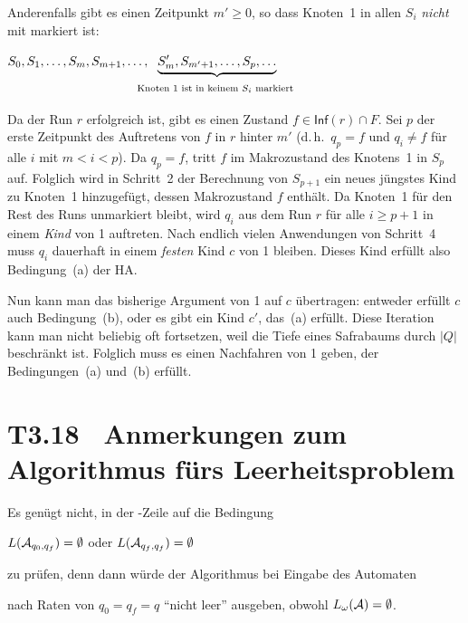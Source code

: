 \documentclass[fontsize=11pt, twoside=false, numbers=autoenddot]{scrbook}
\begin{document}
Anderenfalls gibt es einen Zeitpunkt $m' \geq 0$, %
so dass Knoten~1 in allen $S_i$ \emph{nicht} mit \circled{!} markiert ist:
%
\begin{center}
  $S_0,S_1,\dots,S_m,S_{m+1},\dots,\!\!\!\!\!\!\underbrace{S_m',S_{m'+1},\dots,S_p,\dots}_{%
    \text{%
      \begin{tabular}{@{}l@{}}
        Knoten 1 ist in keinem $S_i$ markiert %
      \end{tabular}
    }
  }$
\end{center}
%
Da der Run $r$ erfolgreich ist, gibt es einen Zustand $f \in \textsf{Inf}(r) \cap F$.
Sei $p$ der erste Zeitpunkt des Auftretens von $f$ in $r$ hinter $m'$
(d.\,h.\ $q_p = f$ und $q_i \neq f$ für alle $i$ mit $m < i < p$).
Da $q_p = f$, tritt $f$ im Makrozustand des Knotens~1 in $S_p$ auf.
Folglich wird in Schritt~2 der Berechnung von $S_{p+1}$ ein neues jüngstes Kind
zu Knoten~1 hinzugefügt, dessen Makrozustand $f$ enthält.
Da Knoten~1 für den Rest des Runs unmarkiert bleibt,
wird $q_i$ aus dem Run $r$ für alle $i \geq p+1$ in einem \emph{Kind} von 1 auftreten.
Nach endlich vielen Anwendungen von Schritt~4 muss $q_i$ dauerhaft
in einem \emph{festen} Kind $c$ von 1 bleiben.
Dieses Kind erfüllt also Bedingung~(a) der HA.

Nun kann man das bisherige Argument von 1 auf $c$ übertragen:
entweder erfüllt $c$ auch Bedingung~(b),
oder es gibt ein Kind $c'$, das~(a) erfüllt.
Diese Iteration kann man nicht beliebig oft fortsetzen,
weil die Tiefe eines Safrabaums durch $|Q|$ beschränkt ist.
Folglich muss es einen Nachfahren von 1 geben, der Bedingungen~(a)
und~(b) erfüllt.
\qedhere

\pagebreak
\section*{T3.18~ Anmerkungen zum Algorithmus fürs Leerheitsproblem}

Es genügt nicht, in der -Zeile auf die Bedingung
%
\begin{center}
  $L(\mathcal{A}_{q_0,q_f}) = \emptyset$ oder $L(\mathcal{A}_{q_f,q_f}) = \emptyset$
\end{center}
%
zu prüfen, denn dann würde der Algorithmus bei Eingabe des Automaten
%
\begin{center}
\end{center}
%
nach Raten von $q_0=q_f=q$ "`nicht leer"' ausgeben, obwohl $L_\omega(\mathcal{A}) = \emptyset$.
\end{document}
